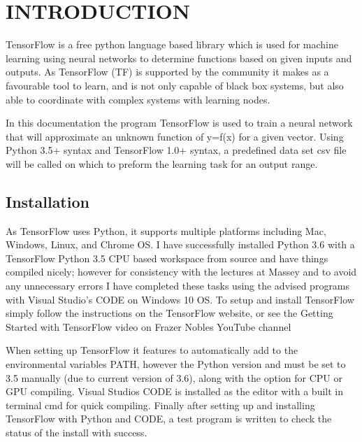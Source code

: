 \documentclass[a4paper, 10pt]{IEEEconf}
\begin{document}
\section{INTRODUCTION}

TensorFlow is a free python language based library which is used for machine learning using neural networks to determine functions based on given inputs and outputs. As TensorFlow (TF) is supported by the community it makes as a favourable tool to learn, and is not only capable of black box systems, but also able to coordinate with complex systems with learning nodes.

In this documentation the program TensorFlow is used to train a neural network that will approximate an unknown function of y=f(x) for a given vector. Using Python 3.5+ syntax and TensorFlow 1.0+ syntax, a predefined data set csv file will be called on which to preform the learning task for an output range.



\subsection{Installation}

As TensorFlow uses Python, it supports multiple platforms including Mac, Windows, Linux, and Chrome OS. I have successfully installed Python 3.6 with a TensorFlow Python 3.5 CPU based workspace from source and have things compiled nicely; however for consistency with the lectures at Massey and to avoid any unnecessary errors I have completed these tasks using the advised programs with Visual Studio's CODE on Windows 10 OS. To setup and install TensorFlow simply follow the instructions on the TensorFlow website, or see the Getting Started with TensorFlow video on Frazer Nobles YouTube channel \cite{tfinstall}

When setting up TensorFlow it features to automatically add to the environmental variables PATH, however the Python version and must be set to 3.5 manually (due to current version of 3.6), along with the option for CPU or GPU compiling. Visual Studios CODE is installed as the editor with a built in terminal cmd for quick compiling. Finally after setting up and installing TensorFlow with Python and CODE, a test program is written to check the status of the install with success.
\end{document}
